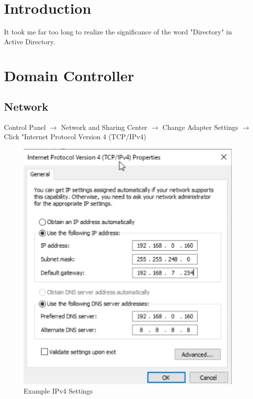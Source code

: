 \documentclass{article}
\begin{document}
\graphicspath{ {./Images/} }
\tableofcontents

\section{Introduction}
It took me far too long to realize the significance of the word "Directory" in Active Directory.



\section{Domain Controller}

\subsection{Network}
Control Panel $\rightarrow$ Network and Sharing Center $\rightarrow$
Change Adapter Settings $\rightarrow$ Click "Internet Protocol Version 4 (TCP/IPv4)

\begin{figure}[]
        \centering
        \includegraphics[width=1\textwidth]{SampleDCIPv4.png}
        \caption{Example IPv4 Settings}
        \label{fig:IPv4Settings}
\end{figure}
\end{document}

